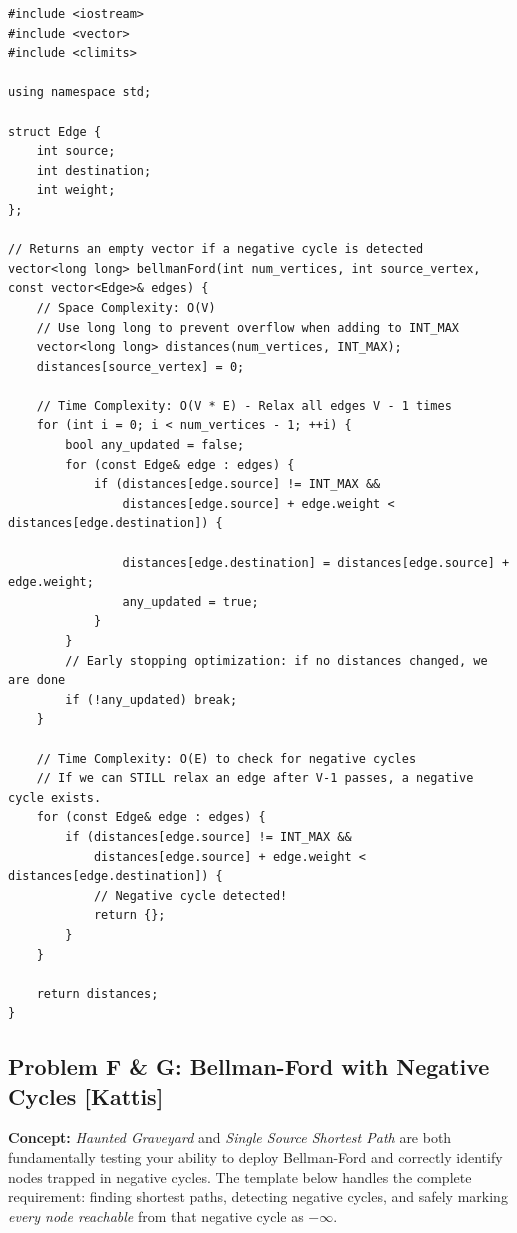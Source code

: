 \begin{lstlisting}
#include <iostream>
#include <vector>
#include <climits>

using namespace std;

struct Edge {
    int source;
    int destination;
    int weight;
};

// Returns an empty vector if a negative cycle is detected
vector<long long> bellmanFord(int num_vertices, int source_vertex, const vector<Edge>& edges) {
    // Space Complexity: O(V)
    // Use long long to prevent overflow when adding to INT_MAX
    vector<long long> distances(num_vertices, INT_MAX);
    distances[source_vertex] = 0;
    
    // Time Complexity: O(V * E) - Relax all edges V - 1 times
    for (int i = 0; i < num_vertices - 1; ++i) {
        bool any_updated = false;
        for (const Edge& edge : edges) {
            if (distances[edge.source] != INT_MAX && 
                distances[edge.source] + edge.weight < distances[edge.destination]) {
                
                distances[edge.destination] = distances[edge.source] + edge.weight;
                any_updated = true;
            }
        }
        // Early stopping optimization: if no distances changed, we are done
        if (!any_updated) break;
    }
    
    // Time Complexity: O(E) to check for negative cycles
    // If we can STILL relax an edge after V-1 passes, a negative cycle exists.
    for (const Edge& edge : edges) {
        if (distances[edge.source] != INT_MAX && 
            distances[edge.source] + edge.weight < distances[edge.destination]) {
            // Negative cycle detected!
            return {}; 
        }
    }
    
    return distances;
}
\end{lstlisting}

\subsection{Problem F \& G: Bellman-Ford with Negative Cycles [Kattis]}
\textbf{Concept:} \textit{Haunted Graveyard} and \textit{Single Source Shortest Path} are both fundamentally testing your ability to deploy Bellman-Ford and correctly identify nodes trapped in negative cycles.
The template below handles the complete requirement: finding shortest paths, detecting negative cycles, and safely marking \textit{every node reachable} from that negative cycle as $-\infty$.

